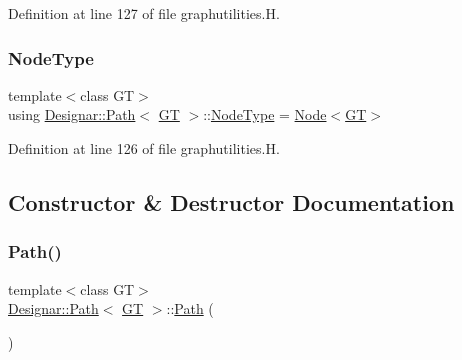 Definition at line 127 of file graphutilities.\+H.

\mbox{\label{class_designar_1_1_path_a7b499fd50e96e3360968d4cfef7a3736}} 
\subsubsection{\texorpdfstring{Node\+Type}{NodeType}}
{\footnotesize\ttfamily template$<$class GT$>$ \\
using \hyperlink{class_designar_1_1_path}{Designar\+::\+Path}$<$ \hyperlink{demo-buildgraph_8_c_a3001c40d2c31ca87ed96cd7d1334a55e}{GT} $>$\+::\hyperlink{class_designar_1_1_path_a7b499fd50e96e3360968d4cfef7a3736}{Node\+Type} =  \hyperlink{namespace_designar_a5af326c65aa2bd26b26c410f2030d09e}{Node}$<$\hyperlink{demo-buildgraph_8_c_a3001c40d2c31ca87ed96cd7d1334a55e}{GT}$>$}



Definition at line 126 of file graphutilities.\+H.



\subsection{Constructor \& Destructor Documentation}
\mbox{\label{class_designar_1_1_path_a47a3b5f01fba6977f57ad84fb6f1fda9}} 
\subsubsection{\texorpdfstring{Path()}{Path()}\hspace{0.1cm}{\footnotesize\ttfamily [1/4]}}
{\footnotesize\ttfamily template$<$class GT$>$ \\
\hyperlink{class_designar_1_1_path}{Designar\+::\+Path}$<$ \hyperlink{demo-buildgraph_8_c_a3001c40d2c31ca87ed96cd7d1334a55e}{GT} $>$\+::\hyperlink{class_designar_1_1_path}{Path} (\begin{DoxyParamCaption}{ }\end{DoxyParamCaption})\hspace{0.3cm}{\ttfamily [inline]}}



